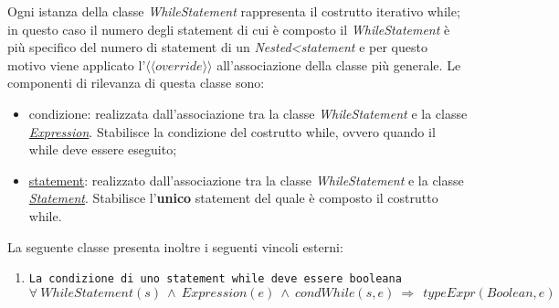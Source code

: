 
Ogni istanza della classe \textit{WhileStatement} rappresenta il costrutto iterativo while; in questo caso il numero degli statement di cui è composto il \textit{WhileStatement} è più specifico del numero di statement di un \textit{Nested<statement} e per questo motivo viene applicato l'$\langle\langle override \rangle\rangle$ all'associazione della classe più generale. Le componenti di rilevanza di questa classe sono:
\begin{itemize}
	\item condizione: realizzata dall'associazione tra la classe \textit{WhileStatement} e la classe \hyperref[sec:modelstranslator:analysis:model_analysis:expression]{\textit{Expression}}. Stabilisce la condizione del costrutto while, ovvero quando il while deve essere eseguito;
	\item \hyperref[sec:modelstranslator:analysis:statements_analysis:statement]{statement}: realizzato dall'associazione tra la classe \textit{WhileStatement} e la classe \hyperref[sec:modelstranslator:analysis:statements_analysis:statement]{\textit{Statement}}. Stabilisce l'\textbf{unico} statement del quale è composto il costrutto while.
\end{itemize}

La seguente classe presenta inoltre i seguenti vincoli esterni:
\begin{enumerate}
	\item \texttt{La condizione di uno statement while deve essere booleana} \\
		  $\forall \ WhileStatement(s) \ \land \ Expression(e) \ \land \ condWhile(s, e) \ \Rightarrow \ \ typeExpr(Boolean, e)$ \\  
\end{enumerate}